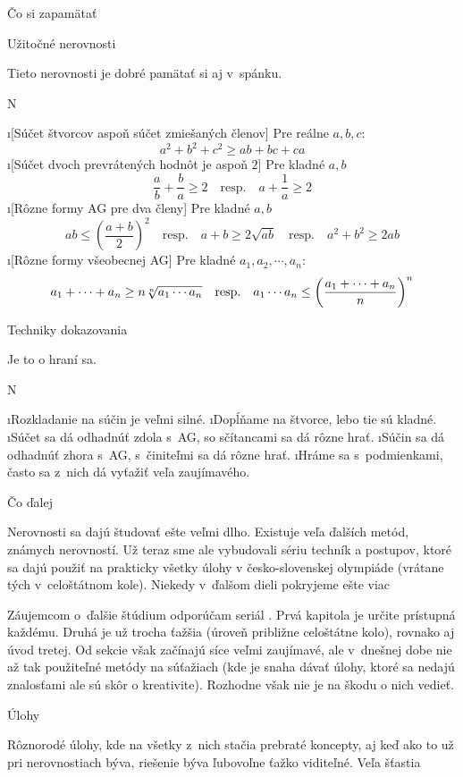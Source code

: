 \sec Čo si zapamätať

\secc Užitočné nerovnosti

Tieto nerovnosti je dobré pamätať si aj v~spánku.

\begitems \style N

\i [Súčet štvorcov aspoň súčet zmiešaných členov] Pre reálne $a,b,c$: 
$$
a^2+b^2+c^2 \ge ab+bc+ca
$$
\i [Súčet dvoch prevrátených hodnôt je aspoň $2$] Pre kladné $a,b$
$$
\frac ab + \frac ba \ge 2  \quad\text{resp.}\quad a + \frac 1a \ge 2
$$
\i [Rôzne formy AG pre dva členy] Pre kladné $a,b$
$$
ab \leq \left(\frac{a+b}{2}\right)^2 \quad\text{resp.}\quad
a+b \ge 2\sqrt{ab} \quad\text{resp.}\quad
a^2+b^2 \ge 2ab
$$
\i [Rôzne formy všeobecnej AG] Pre kladné $a_1,a_2,\cdots,a_n$:
$$
a_1+\cdots+a_n \ge n \root n \of {a_1\cdots a_n}  \quad\text{resp.}\quad
a_1 \cdots a_n \leq \left(\frac{a_1+\cdots+a_n}{n}\right)^n
$$
\enditems 

\secc Techniky dokazovania

Je to o hraní sa.

\begitems \style N

\i Rozkladanie na súčin je veľmi silné.
\i Dopĺňame na štvorce, lebo tie sú kladné.
\i Súčet sa dá odhadnúť zdola s~AG, so sčítancami sa dá rôzne hrať.
\i Súčin sa dá odhadnúť zhora s~AG, s~činiteľmi sa dá rôzne hrať.
\i Hráme sa s~podmienkami, často sa z~nich dá vyťažiť veľa zaujímavého.

\enditems 

\sec Čo ďalej

Nerovnosti sa dajú študovať ešte veľmi dlho. Existuje veľa ďalších metód, známych nerovností. Už teraz sme ale vybudovali sériu techník a postupov, ktoré sa dajú použiť na prakticky všetky úlohy v česko-slovenskej olympiáde (vrátane tých v~celoštátnom kole). Niekedy v~ďalšom dieli pokryjeme ešte viac \SlightSmile{}

Záujemcom o~ďalšie štúdium odporúčam  seriál . Prvá kapitola je určite prístupná každému. Druhá je už trocha ťažšia (úroveň približne celoštátne kolo), rovnako aj úvod tretej. Od sekcie  však začínajú síce veľmi zaujímavé, ale v~dnešnej dobe nie až tak použiteľné metódy na súťažiach (kde je snaha dávať úlohy, ktoré sa nedajú  znalosťami ale sú skôr o kreativite). Rozhodne však nie je na škodu o nich vedieť.

\sec Úlohy

Rôznorodé úlohy, kde na všetky z~nich stačia prebraté koncepty, aj keď ako to už pri nerovnostiach býva, riešenie býva ľubovoľne ťažko viditeľné. Veľa šťastia~\SlightSmile{}

